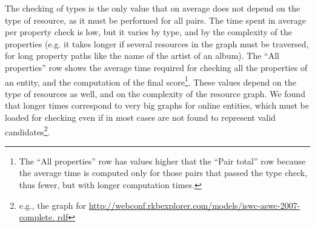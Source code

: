 The checking of types is the only value that on average does not depend on the type of resource, as it must be performed for all pairs. The time spent in average per property check is low, but it varies by type, and by the complexity of the properties (e.g. it takes longer if several resources in the graph must be traversed, for long property paths like the name of the artist of an album). The ``All properties'' row shows the average time required for checking all the properties of an entity, and the computation of the final score\footnote{The ``All properties'' row has values higher that the ``Pair total'' row because the average time is computed only for those pairs that passed the type check, thus fewer, but with longer computation times.}. These values depend on the type of resources as well, and on the complexity of the resource graph. We found that longer times correspond to very big graphs for online entities, which must be loaded for checking even if in most cases are not found to represent valid 
candidates\footnote{e.g., the graph for \url{http://webconf.rkbexplorer.com/models/iswc-aswc-2007-complete.
rdf}}.
